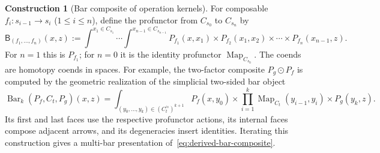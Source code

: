 \documentclass[oneside]{article}
\theoremstyle{plain}
\theoremstyle{definition}
\newtheorem{construction}[theorem]{Construction}
\theoremstyle{remark}
\newcommand{\Map}{\operatorname{Map}}
\newcommand{\core}{\simeq}
\begin{document}
\begin{construction}[Bar composite of operation kernels]
\label{con:derived-bar-composite}
For composable $f_i:s_{i-1}\to s_i$ ($1\leq i\leq n$), define the
profunctor from $C_{s_0}$ to $C_{s_n}$ by
\begin{equation}\label{eq:derived-bar-composite}
 \mathsf B_{(f_1,\ldots,f_n)}(x,z)
 :=\int^{x_1\in C_{s_1}}\cdots
    \int^{x_{n-1}\in C_{s_{n-1}}}
    P_{f_1}(x,x_1)\times P_{f_2}(x_1,x_2)
    \times\cdots\times P_{f_n}(x_{n-1},z).
\end{equation}
For $n=1$ this is $P_{f_1}$; for $n=0$ it is the identity
profunctor $\Map_{C_{s_0}}$. The coends are homotopy coends in
spaces. For example, the two-factor composite
$P_g\odot P_f$ is computed by the geometric realization of the
simplicial two-sided bar object
\begin{equation}\label{eq:derived-bar-resolution}
 \operatorname{Bar}_k(P_f,C_t,P_g)(x,z)
 =\int_{(y_0,\ldots,y_k)\in(C_t^\core)^{k+1}}
 P_f(x,y_0)\times
 \prod_{i=1}^k\Map_{C_t}(y_{i-1},y_i)
 \times P_g(y_k,z).
\end{equation}
Its first and last faces use the respective profunctor actions,
its internal faces compose adjacent arrows, and its degeneracies
insert identities. Iterating this construction gives a multi-bar
presentation of~\eqref{eq:derived-bar-composite}.
\end{construction}
\end{document}
